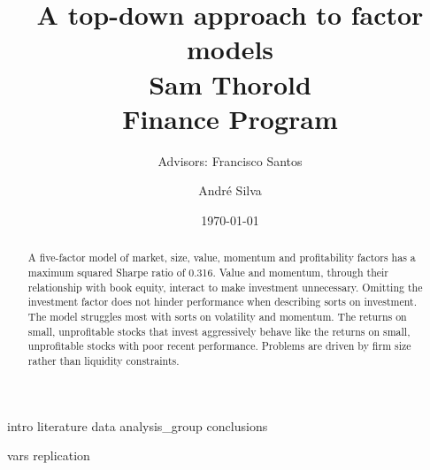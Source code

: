 \documentclass[a4paper, 12pt]{article}
\title{
  {A top-down approach to factor models}\\[1cm]
  {\Large Sam Thorold}\\%
  {\large Finance Program}\\
}
\author[1]{Advisors: Francisco Santos}
\affil[1]{Norwegian School of Economics}
\author[2]{Andr\'e Silva}
\affil[2]{NOVA School of Business and Economics}
\date{\today}
\begin{document}
\maketitle

\begin{abstract}
  A five-factor model of
  market, size, value, momentum and profitability factors
  has a maximum squared Sharpe ratio of 0.316.
  Value and momentum, through their relationship with book equity,
  interact to make investment unnecessary.
  Omitting the investment factor does not hinder performance when describing
  sorts on investment.
  The model struggles most with sorts on volatility and momentum.
  The returns on small, unprofitable stocks that invest aggressively behave
  like the returns on small, unprofitable stocks with poor recent performance.
  Problems are driven by firm size rather than liquidity constraints.
\end{abstract}

\pagebreak

\doublespacing

{intro}
{literature}
{data}
{analysis_group}
{conclusions}


\printbibliography

\appendix
{vars}
{replication}
\end{document}
